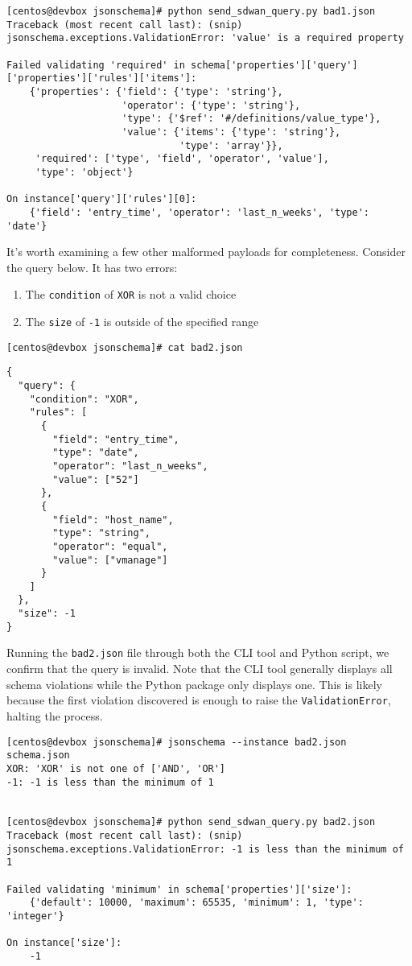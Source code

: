 \begin{verbatim}
[centos@devbox jsonschema]# python send_sdwan_query.py bad1.json
Traceback (most recent call last): (snip)
jsonschema.exceptions.ValidationError: 'value' is a required property

Failed validating 'required' in schema['properties']['query']['properties']['rules']['items']:
    {'properties': {'field': {'type': 'string'},
                    'operator': {'type': 'string'},
                    'type': {'$ref': '#/definitions/value_type'},
                    'value': {'items': {'type': 'string'},
                              'type': 'array'}},
     'required': ['type', 'field', 'operator', 'value'],
     'type': 'object'}

On instance['query']['rules'][0]:
    {'field': 'entry_time', 'operator': 'last_n_weeks', 'type': 'date'}
\end{verbatim}

It's worth examining a few other malformed payloads for completeness.
Consider the query below. It has two errors:

\begin{enumerate}
  \item The \verb|condition| of \verb|XOR| is not a valid choice
  \item The \verb|size| of \verb|-1| is outside of the specified range
\end{enumerate}

\begin{verbatim}
[centos@devbox jsonschema]# cat bad2.json
\end{verbatim}

\begin{verbatim}
{
  "query": {
    "condition": "XOR",
    "rules": [
      {
        "field": "entry_time",
        "type": "date",
        "operator": "last_n_weeks",
        "value": ["52"]
      },
      {
        "field": "host_name",
        "type": "string",
        "operator": "equal",
        "value": ["vmanage"]
      }
    ]
  },
  "size": -1
}
\end{verbatim}

Running the \verb|bad2.json| file through both the CLI tool and Python
script, we confirm that the query is invalid. Note that the CLI tool
generally displays all schema violations while the Python package only
displays one. This is likely because the first violation discovered
is enough to raise the \verb|ValidationError|, halting the process.

\begin{verbatim}
[centos@devbox jsonschema]# jsonschema --instance bad2.json schema.json
XOR: 'XOR' is not one of ['AND', 'OR']
-1: -1 is less than the minimum of 1


[centos@devbox jsonschema]# python send_sdwan_query.py bad2.json
Traceback (most recent call last): (snip)
jsonschema.exceptions.ValidationError: -1 is less than the minimum of 1

Failed validating 'minimum' in schema['properties']['size']:
    {'default': 10000, 'maximum': 65535, 'minimum': 1, 'type': 'integer'}

On instance['size']:
    -1
\end{verbatim}

